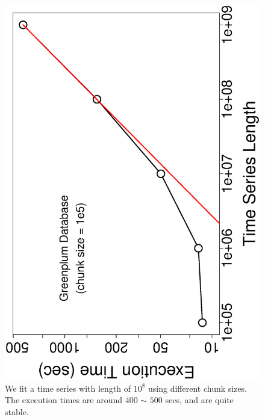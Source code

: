 \documentclass[english,10pt]{llncs}
\begin{document}
\begin{figure}[ht]
  \begin{centering}
    \includegraphics[angle=-90,scale=0.4]{gp_time_vs_size}
  \end{centering}
  \caption{\label{fig:gp_time_size} We fit a time series with length
    of $10^8$ using different chunk sizes. The execution times are
    around $400$ $\sim$ $500$ secs, and are quite stable. }
\end{figure}
\end{document}
